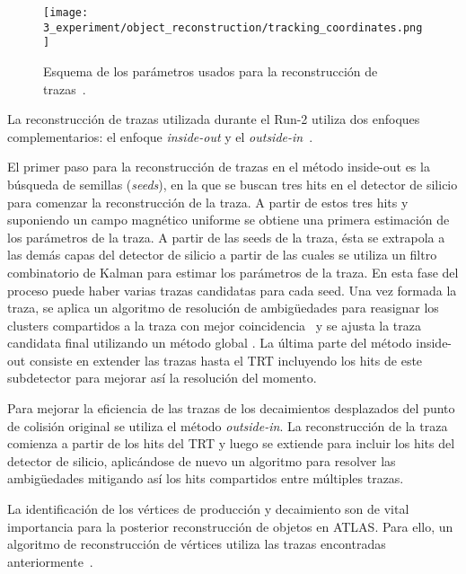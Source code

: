 \begin{figure}[ht!]
    \centering
    \texttt{[image: 3\_experiment/object\_reconstruction/tracking\_coordinates.png]}
    \caption{Esquema de los parámetros usados para la reconstrucción de trazas~\cite{ATLAS-Tracking-2007}.}
    \label{fig:objects:track_vtx:track_parameters}
\end{figure}

La reconstrucción de trazas utilizada durante el Run-2 utiliza dos enfoques complementarios: el enfoque \textit{inside-out} y el \textit{outside-in}~\cite{ATLAS-NEWT}.

El primer paso para la reconstrucción de trazas en el método inside-out es la búsqueda de semillas (\textit{seeds}), en la que se buscan tres hits en el detector de silicio para comenzar la reconstrucción de la traza. A partir de estos tres hits y suponiendo un campo magnético uniforme se obtiene una primera estimación de los parámetros de la traza. A partir de las seeds de la traza, ésta se extrapola a las demás capas del detector de silicio a partir de las cuales se utiliza un filtro combinatorio de Kalman para estimar los parámetros de la traza. En esta fase del proceso puede haber varias trazas candidatas para cada seed. Una vez formada la traza, se aplica un algoritmo de resolución de ambigüedades para reasignar los clusters compartidos a la traza con mejor coincidencia~\cite{ATLAS-NNClustering} y se ajusta la traza candidata final utilizando un método global \chisq. La última parte del método inside-out consiste en extender las trazas hasta el \ac{TRT} incluyendo los hits de este subdetector para mejorar así la resolución del momento.

Para mejorar la eficiencia de las trazas de los decaimientos desplazados del punto de colisión original se utiliza el método \textit{outside-in}. La reconstrucción de la traza comienza a partir de los hits del \ac{TRT} y luego se extiende para incluir los hits del detector de silicio, aplicándose de nuevo un algoritmo para resolver las ambigüedades mitigando así los hits compartidos entre múltiples trazas.

La identificación de los vértices de producción y decaimiento son de vital importancia para la posterior reconstrucción de objetos en \ac{ATLAS}.
Para ello, un algoritmo de reconstrucción de vértices utiliza las trazas encontradas anteriormente~\cite{ATLAS-PVReconstruction,ATLAS-VertexReconstruction}.

